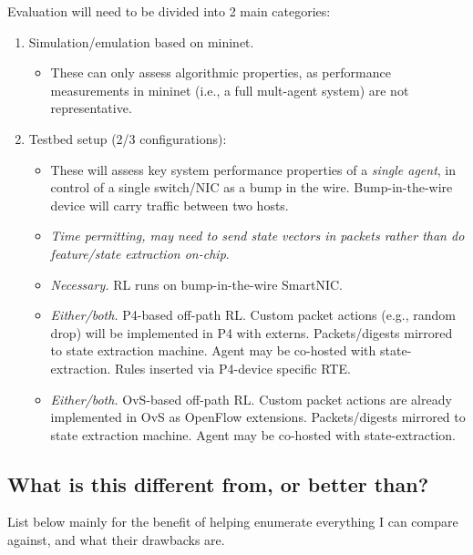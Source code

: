 \documentclass[sigconf,natbib=false]{acmart}
\begin{document}
\begin{appendices}
	Evaluation will need to be divided into 2 main categories:
	\begin{enumerate}
		\item Simulation/emulation based on mininet.
		\begin{itemize}
			\item These can only assess algorithmic properties, as performance measurements in mininet (i.e., a full mult-agent system) are not representative.
		\end{itemize}
		\item Testbed setup (2/3 configurations):
		\begin{itemize}
			\item These will assess key system performance properties of a \emph{single agent}, in control of a single switch/NIC as a bump in the wire. Bump-in-the-wire device will carry traffic between two hosts.
			\item \emph{Time permitting, may need to send state vectors in packets rather than do feature/state extraction on-chip}.
			\item \emph{Necessary.} RL runs on bump-in-the-wire SmartNIC.
			\item \emph{Either/both.} P4-based off-path RL. Custom packet actions (e.g., random drop) will be implemented in P4 with externs. Packets/digests mirrored to state extraction machine. Agent may be co-hosted with state-extraction. Rules inserted via P4-device specific RTE.
			\item \emph{Either/both.} OvS-based off-path RL. Custom packet actions are already implemented in OvS as OpenFlow extensions. Packets/digests mirrored to state extraction machine. Agent may be co-hosted with state-extraction.
		\end{itemize}
	\end{enumerate}
	
	\subsection{What is this different from, or better than?}
	List below mainly for the benefit of helping enumerate everything I can compare against, and what their drawbacks are.
	

\end{appendices}
\end{document}
